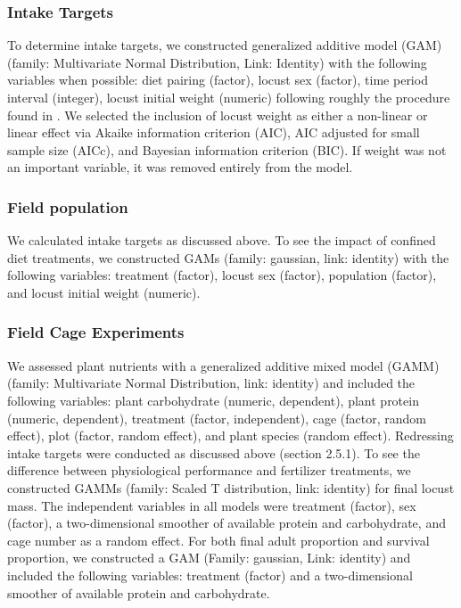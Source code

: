 \documentclass[
]{article}
\begin{document}
\subsubsection{Intake Targets}\label{intake-targets}

To determine intake targets, we constructed generalized additive model
(GAM) (family: Multivariate Normal Distribution, Link: Identity) with
the following variables when possible: diet pairing (factor), locust sex
(factor), time period interval (integer), locust initial weight
(numeric) following roughly the procedure found in
\citet{lawton_mismatched_2021}. We selected the inclusion of locust
weight as either a non-linear or linear effect via Akaike information
criterion (AIC), AIC adjusted for small sample size (AICc), and Bayesian
information criterion (BIC). If weight was not an important variable, it
was removed entirely from the model.

\subsubsection{Field population}\label{field-population}

We calculated intake targets as discussed above. To see the impact of
confined diet treatments, we constructed GAMs (family: gaussian, link:
identity) with the following variables: treatment (factor), locust sex
(factor), population (factor), and locust initial weight (numeric).

\subsubsection{Field Cage Experiments}\label{field-cage-experiments-1}

We assessed plant nutrients with a generalized additive mixed model
(GAMM) (family: Multivariate Normal Distribution, link: identity) and
included the following variables: plant carbohydrate (numeric,
dependent), plant protein (numeric, dependent), treatment (factor,
independent), cage (factor, random effect), plot (factor, random
effect), and plant species (random effect). Redressing intake targets
were conducted as discussed above (section 2.5.1). To see the difference
between physiological performance and fertilizer treatments, we
constructed GAMMs (family: Scaled T distribution, link: identity) for
final locust mass. The independent variables in all models were
treatment (factor), sex (factor), a two-dimensional smoother of
available protein and carbohydrate, and cage number as a random effect.
For both final adult proportion and survival proportion, we constructed
a GAM (Family: gaussian, Link: identity) and included the following
variables: treatment (factor) and a two-dimensional smoother of
available protein and carbohydrate.
\end{document}
